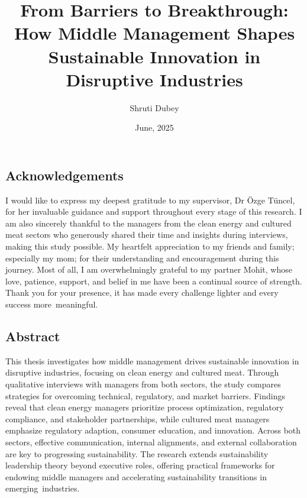 \documentclass[12pt,a4paper]{article}
\title{From Barriers to Breakthrough: How Middle Management Shapes Sustainable Innovation in Disruptive Industries}
\author{Shruti Dubey}
\date{June, 2025}
\begin{document}
	
	\hypersetup{
		colorlinks=false,
		linkbordercolor=white,
		linkcolor=white,
		filecolor=white,      
		urlcolor=white,
		citecolor=white,
	}
	

	
	
\begin{center}
	\section*{Acknowledgements}
\end{center}
	I would like to express my deepest gratitude to my supervisor, Dr Özge Tüncel, for her invaluable guidance and support throughout every stage of this research. I am also sincerely thankful to the managers from the clean energy and cultured meat sectors who generously shared their time and insights during interviews, making this study possible. My heartfelt appreciation to my friends and family; especially my mom; for their understanding and encouragement during this journey. Most of all, I am overwhelmingly grateful to my partner Mohit, whose love, patience, support, and belief in me have been a continual source of strength. Thank you for your presence, it has made every challenge lighter and every success more meaningful.
	\newpage
\begin{center}
	\section*{Abstract}
\end{center}
		This thesis investigates how middle management drives sustainable innovation in disruptive industries, focusing on clean energy and cultured meat. Through qualitative interviews with managers from both sectors, the study compares strategies for overcoming technical, regulatory, and market barriers. Findings reveal that clean energy managers prioritize process optimization, regulatory compliance, and stakeholder partnerships, while cultured meat managers emphasize regulatory adaption, consumer education, and innovation. Across both sectors, effective communication, internal alignments, and external collaboration are key to progressing sustainability. The research extends sustainability leadership theory beyond executive roles, offering practical frameworks for endowing middle managers and accelerating sustainability transitions in emerging industries.

	\newpage
	\tableofcontents
	\newpage
	\listoftables
	\listoffigures
	\newpage
	
    
	
	
	
	
	
	
	\printacronyms
	\printglossaries
	\printbibliography
	\newpage
	\begin{appendices}
	
	
	\end{appendices}
	
	
	
	
\end{document}
